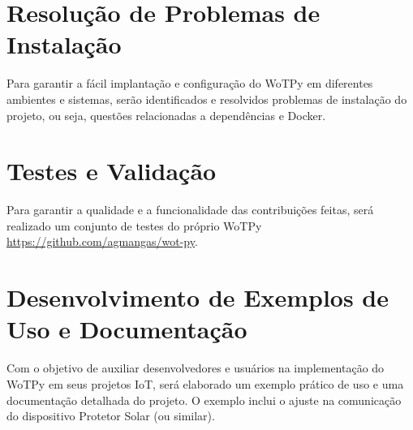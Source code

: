 \section{Resolução de Problemas de Instalação} \label{instalação}

Para garantir a fácil implantação e configuração do WoTPy em diferentes ambientes e sistemas, serão identificados e resolvidos problemas de instalação do projeto, ou seja, questões relacionadas a dependências e Docker.

\section{Testes e Validação} \label{teste}

Para garantir a qualidade e a funcionalidade das contribuições feitas, será realizado um conjunto de testes do próprio WoTPy \url{https://github.com/agmangas/wot-py}.

\section{Desenvolvimento de Exemplos de Uso e Documentação} \label{uso}

Com o objetivo de auxiliar desenvolvedores e usuários na implementação do WoTPy em seus projetos IoT, será elaborado um exemplo prático de uso e uma documentação detalhada do projeto. O exemplo inclui o ajuste na comunicação do dispositivo Protetor Solar \cite{ProtetorSolar} (ou similar).

